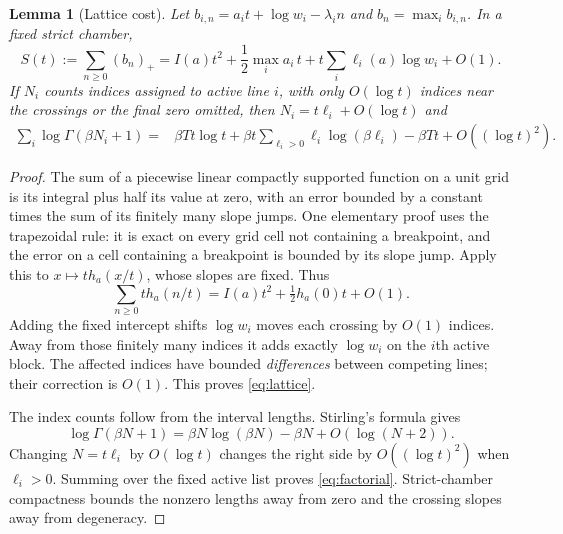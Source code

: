 \documentclass[11pt,a4paper]{article}
\newtheorem{lemma}[theorem]{Lemma}
\theoremstyle{definition}
\theoremstyle{remark}
\newcommand{\pos}[1]{\left(#1\right)_+}
\numberwithin{equation}{section}
\begin{document}
\begin{lemma}[Lattice cost]
\label{lem:lattice}
Let $b_{i,n}=a_it+\log w_i-\lambda_i n$ and
$b_n=\max_i b_{i,n}$. In a fixed strict chamber,
\begin{equation}
 S(t):=\sum_{n\ge0}\pos{b_n}
 =I(a)t^2+\frac12\max_i a_i\,t
    +t\sum_i\ell_i(a)\log w_i+O(1).
 \label{eq:lattice}
\end{equation}
If $N_i$ counts indices assigned to active line $i$, with only
$O(\log t)$ indices near the crossings or the final zero omitted, then
$N_i=t\ell_i+O(\log t)$ and
\begin{equation}
 \begin{split}
 \sum_i\log\Gamma(\beta N_i+1)
 ={}&\beta Tt\log t
  +\beta t\sum_{\ell_i>0}\ell_i\log(\beta\ell_i)
  -\beta Tt+O((\log t)^2).
 \end{split}
 \label{eq:factorial}
\end{equation}
\end{lemma}
\begin{proof}
The sum of a piecewise linear compactly supported function on a unit grid
is its integral plus half its value at zero, with an error bounded by a
constant times the sum of its finitely many slope jumps. One elementary
proof uses the trapezoidal rule: it is exact on every grid cell not
containing a breakpoint, and the error on a cell containing a breakpoint is
bounded by its slope jump. Apply this to
$x\mapsto t h_a(x/t)$, whose slopes are fixed. Thus
\[
 \sum_{n\ge0}t h_a(n/t)=I(a)t^2+\tfrac12 h_a(0)t+O(1).
\]
Adding the fixed intercept shifts $\log w_i$ moves each crossing by
$O(1)$ indices. Away from those finitely many indices it adds exactly
$\log w_i$ on the $i$th active block. The affected indices have bounded
\emph{differences} between competing lines; their correction is $O(1)$.
This proves \eqref{eq:lattice}.

The index counts follow from the interval lengths. Stirling's formula gives
\[
 \log\Gamma(\beta N+1)=\beta N\log(\beta N)-\beta N+O(\log(N+2)).
\]
Changing $N=t\ell_i$ by $O(\log t)$ changes the right side by
$O((\log t)^2)$ when $\ell_i>0$. Summing over the fixed active list proves
\eqref{eq:factorial}. Strict-chamber compactness bounds the nonzero lengths
away from zero and the crossing slopes away from degeneracy.
\end{proof}
\end{document}
